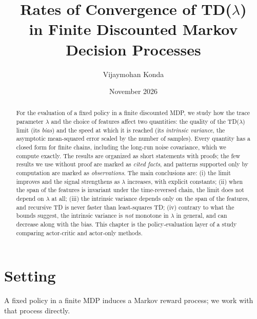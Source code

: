 \documentclass[11pt]{article}
\title{Rates of Convergence of TD($\lambda$)\\ in Finite Discounted Markov Decision Processes}
\author{Vijaymohan Konda}
\date{November 2026}
\theoremstyle{definition}
\theoremstyle{remark}
\begin{document}
\maketitle

\begin{abstract}
For the evaluation of a fixed policy in a finite discounted MDP, we study how the
trace parameter $\lambda$ and the choice of features affect two quantities: the
quality of the TD($\lambda$) limit (its \emph{bias}) and the speed at which it is
reached (its \emph{intrinsic variance}, the asymptotic mean-squared error scaled by
the number of samples). Every quantity has a closed form for finite chains,
including the long-run noise covariance, which we compute exactly. The results are
organized as short statements with proofs; the few results we use without proof are
marked as \emph{cited facts}, and patterns supported only by computation are marked
as \emph{observations}. The main conclusions are: (i) the limit improves and the
signal strengthens as $\lambda$ increases, with explicit constants;
(ii) when the span of the features is invariant under the time-reversed chain, the
limit does not depend on $\lambda$ at all; (iii) the intrinsic variance depends only
on the span of the features, and recursive TD is never faster than least-squares TD;
(iv) contrary to what the bounds suggest, the intrinsic variance is \emph{not}
monotone in $\lambda$ in general, and can decrease along with the bias.
This chapter is the policy-evaluation layer of a study comparing actor-critic and
actor-only methods.
\end{abstract}

\tableofcontents

\section{Setting}

A fixed policy in a finite MDP induces a Markov reward process; we work with that
process directly.
\end{document}
